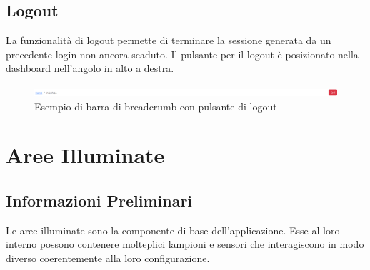 \documentclass[a4paper, 12pt]{article}
\begin{document}
\subsection{Logout}
La funzionalità di logout permette di terminare la sessione generata da un precedente login non ancora scaduto. Il pulsante per il logout è posizionato nella dashboard nell'angolo in alto a destra.
\begin{figure}[H]
\centering
\includegraphics[width=\textwidth]{EsempioBreadcrumbConEsci}
\caption{Esempio di barra di breadcrumb con pulsante di logout}
\end{figure}

\newpage
\section{Aree Illuminate}
\subsection{Informazioni Preliminari}
Le aree illuminate sono la componente di base dell'applicazione. Esse al loro interno possono contenere molteplici lampioni e sensori che interagiscono in modo diverso coerentemente alla loro configurazione.
\end{document}
